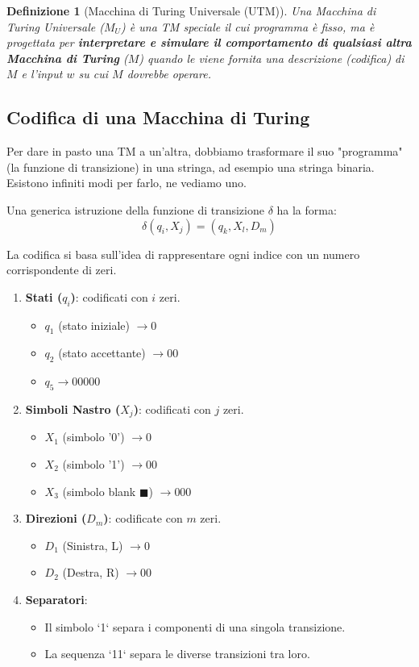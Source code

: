 \documentclass[a4paper]{article}
\newtheorem{definition}{Definizione}
\theoremstyle{remark} %
\begin{document}
\begin{definition}[Macchina di Turing Universale (UTM)]
Una Macchina di Turing Universale ($M_U$) è una TM speciale il cui programma è fisso, ma è progettata per \textbf{interpretare e simulare il comportamento di qualsiasi altra Macchina di Turing} ($M$) quando le viene fornita una descrizione (codifica) di $M$ e l'input $w$ su cui $M$ dovrebbe operare.
\end{definition}

\subsection{Codifica di una Macchina di Turing}

Per dare in pasto una TM a un'altra, dobbiamo trasformare il suo "programma" (la funzione di transizione) in una stringa, ad esempio una stringa binaria. Esistono infiniti modi per farlo, ne vediamo uno.

Una generica istruzione della funzione di transizione $\delta$ ha la forma:
\[ \delta(q_i, X_j) = (q_k, X_l, D_m) \]

La codifica si basa sull'idea di rappresentare ogni indice con un numero corrispondente di zeri.
\begin{enumerate}
    \item \textbf{Stati ($q_i$)}: codificati con $i$ zeri.
    \begin{itemize}
        \item $q_1$ (stato iniziale) $\rightarrow 0$
        \item $q_2$ (stato accettante) $\rightarrow 00$
        \item $q_5 \rightarrow 00000$
    \end{itemize}
    \item \textbf{Simboli Nastro ($X_j$)}: codificati con $j$ zeri.
    \begin{itemize}
        \item $X_1$ (simbolo '0') $\rightarrow 0$
        \item $X_2$ (simbolo '1') $\rightarrow 00$
        \item $X_3$ (simbolo blank $\blacksquare$) $\rightarrow 000$
    \end{itemize}
    \item \textbf{Direzioni ($D_m$)}: codificate con $m$ zeri.
    \begin{itemize}
        \item $D_1$ (Sinistra, L) $\rightarrow 0$
        \item $D_2$ (Destra, R) $\rightarrow 00$
    \end{itemize}
    \item \textbf{Separatori}:
    \begin{itemize}
        \item Il simbolo `1` separa i componenti di una singola transizione.
        \item La sequenza `11` separa le diverse transizioni tra loro.
    \end{itemize}
\end{enumerate}
\end{document}
